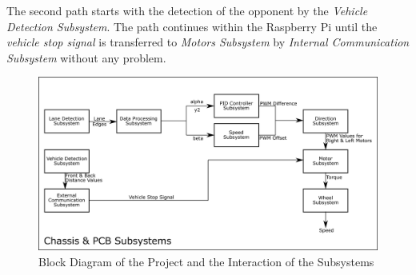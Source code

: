 \documentclass[a4paper,12pt]{article}
\begin{document}
The second path starts with the detection of the opponent by the \textit{Vehicle Detection Subsystem}. The path continues within the Raspberry Pi until the \textit{vehicle stop signal} is transferred to \textit{Motors Subsystem} by \textit{Internal Communication Subsystem} without any problem.



\begin{figure}[h]

\includegraphics[width=\textwidth,center]{images/subsys_block}

\caption{Block Diagram of the Project and the Interaction of the Subsystems}\label{fig:subsys-block}

\end{figure}















\end{document}

